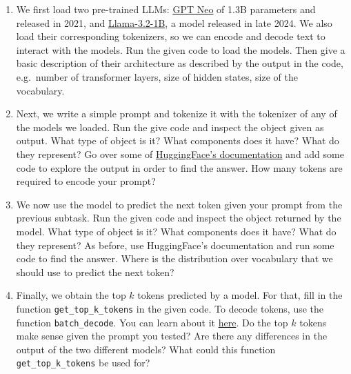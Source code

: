 \documentclass[11pt,a4paper]{article}
\begin{document}
\begin{enumerate}[label=(\alph*)]
    \item We first load two pre-trained LLMs:
          \href{https://github.com/EleutherAI/gpt-neo}{GPT Neo} of 1.3B
          parameters and released in 2021, and
          \href{https://huggingface.co/meta-llama/Llama-3.2-1B}{Llama-3.2-1B},
          a model released in late 2024.
          We also load their corresponding tokenizers, so we can encode and
          decode text to interact with the models.
          Run the given code to load the models.
          Then give a basic description of their architecture as described by
          the output in the code, e.g.\ number of transformer layers, size of
          hidden states, size of the vocabulary.
    \item Next, we write a simple prompt and tokenize it with the
          tokenizer of any of the models we loaded. Run the give code and
          inspect the object given as output. What type of object is it? What
          components does it have? What do they represent? Go over some of
          \href{https://huggingface.co/docs/transformers/index}{HuggingFace's documentation}
          and add some code to explore the output in order to find the answer.
          How many tokens are required to encode your prompt?
    \item We now use the model to predict the next token given your prompt
          from the previous subtask. Run the given code and inspect the object
          returned by the model. What type of object is it? What components does
          it have? What do they represent?
          As before, use HuggingFace's documentation and run some code to find
          the answer.
          Where is the distribution over vocabulary that we should use to
          predict the next token?
    \item Finally, we obtain the top $k$ tokens predicted by a model. For that,
          fill in the function \texttt{get\_top\_k\_tokens} in the given code.
          To decode tokens, use the function \texttt{batch\_decode}. You can
          learn about it
          \href{https://huggingface.co/docs/transformers/en/main_classes/tokenizer#transformers.PreTrainedTokenizerFast.batch_decode}{here}.
          Do the top $k$ tokens make sense given the prompt you tested? Are
          there any differences in the output of the two different models?
          What could this function \texttt{get\_top\_k\_tokens} be used for?
\end{enumerate}
\end{document}
